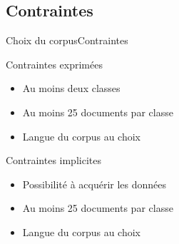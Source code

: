 \subsection{Contraintes}
\begin{frame}{Choix du corpus}{Contraintes}
\begin{block}{Contraintes exprimées}
	\begin{itemize}
	\item Au moins deux classes
	\item Au moins 25 documents par classe
	\item Langue du corpus au choix
	\end{itemize}
\end{block}
\begin{block}{Contraintes implicites}
	\begin{itemize}
	\item Possibilité à acquérir les données
	\item Au moins 25 documents par classe
	\item Langue du corpus au choix
	\end{itemize}
\end{block}
\end{frame}